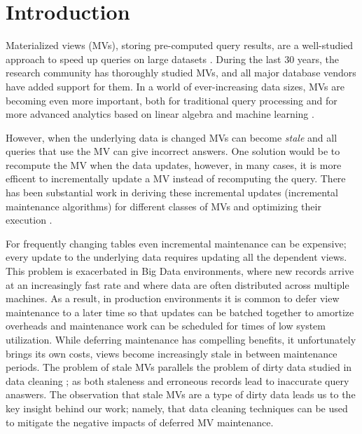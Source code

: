 \vspace{-0.5em}
\section{Introduction}
Materialized views (MVs), storing pre-computed query results, are a well-studied approach to speed up queries on large datasets \cite{LarsonY85, gupta1995maintenance, chirkova2011materialized, halevy2001answering}.
During the last 30 years, the research community has thoroughly studied MVs, and all major database vendors have added support for them.
In a world of ever-increasing data sizes, MVs are becoming even more important, both for traditional query processing
 \cite{lefevre2014opportunistic, bailis2014scalable, perez2014history} and for more advanced analytics based on linear algebra and machine learning \cite{nikolic2014linview, zhang2014mat}.

However, when the underlying data is changed MVs can become \emph{stale} and all queries that use the MV can give incorrect answers. 
One solution would be to recompute the MV when the data updates, however, in many cases, it is more efficent to incrementally update a MV instead of recomputing the query.
There has been substantial work in deriving these incremental updates (incremental maintenance algorithms) for different classes of MVs and optimizing their execution \cite{gupta1995maintenance, DBLP:conf/sigmod/GriffinL95, griffin1997improved, samtani1999self, DBLP:conf/sac/TrutaC07, DBLP:journals/vldb/KochAKNNLS14, chirkova2011materialized}.

For frequently changing tables even incremental maintenance can be expensive; every update to the underlying data requires updating all the dependent views.  
This problem is exacerbated in Big Data environments, where new records arrive at an increasingly fast rate and where data are often 
distributed across multiple machines.  
As a result, in production environments it is common to defer view maintenance to a later time \cite{chirkova2011materialized, zhou2007lazy, DBLP:conf/sigmod/ColbyGLMT96} so that updates can be batched together to amortize overheads and maintenance work can be scheduled for times of low system utilization.  
While deferring maintenance has compelling benefits, it unfortunately brings its own costs, views become increasingly stale in between maintenance periods.   
The problem of stale MVs parallels the problem of dirty data studied in data cleaning \cite{rahm2000data}; as both staleness and erroneous records lead to inaccurate query anaswers.
The observation that stale MVs are a type of dirty data leads us to the key insight behind our work; namely, that data cleaning techniques can be used to mitigate the negative impacts of deferred MV maintenance.  

